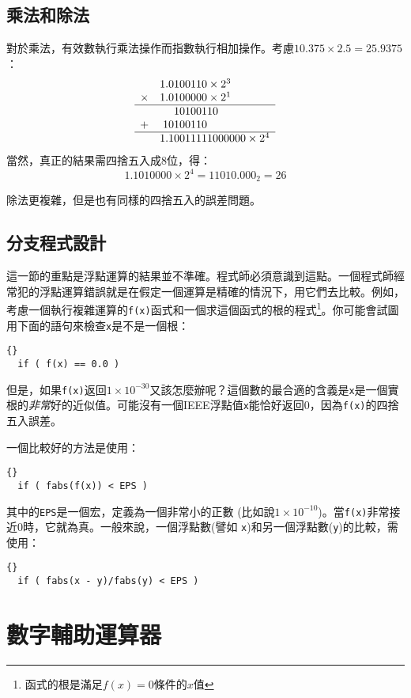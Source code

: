 {\subsection{乘法和除法}

對於乘法，有效數執行乘法操作而指數執行相加操作。考慮$10.375 \times 2.5 = 25.9375$：
\[
\begin{array}{rr@{}l}
 &  1.0&100110 \times 2^3 \\
\times &  1.0&100000 \times 2^1 \\ \hline
 &     &10100110 \\
+&   10&100110   \\ \hline
 &   1.1&0011111000000 \times 2^4
\end{array}
\]
當然，真正的結果需四捨五入成8位，得：
\[1.1010000 \times 2^4 = 11010.000_2 = 26 \]

除法更複雜，但是也有同樣的四捨五入的誤差問題。

\subsection{分支程式設計}

這一節的重點是浮點運算的結果並不準確。程式師必須意識到這點。一個程式師經常犯的浮點運算錯誤就是在假定一個運算是精確的情況下，用它們去比較。例如，考慮一個執行複雜運算的\lstinline|f(x)|函式和一個求這個函式的根的程式\footnote{函式的根是滿足$f(x) = 0$條件的$x$值}。你可能會試圖用下面的語句來檢查\lstinline|x|是不是一個根：
\begin{lstlisting}[stepnumber=0]{}
  if ( f(x) == 0.0 )
\end{lstlisting}
但是，如果\lstinline|f(x)|返回$1 \times 10^{-30}$又該怎麼辦呢？這個數的最合適的含義是\lstinline|x|是一個實根的\emph{非常}好的近似值。可能沒有一個IEEE浮點值\lstinline|x|能恰好返回0，因為\lstinline|f(x)|的四捨五入誤差。

一個比較好的方法是使用：
\begin{lstlisting}[stepnumber=0]{}
  if ( fabs(f(x)) < EPS )
\end{lstlisting}
其中的\lstinline|EPS|是一個宏，定義為一個非常小的正數
(比如說$1 \times 10^{-10}$)。當\lstinline|f(x)|非常接近0時，它就為真。一般來說，一個浮點數(譬如
\lstinline|x|)和另一個浮點數(\lstinline|y|)的比較，需使用：
\begin{lstlisting}[stepnumber=0]{}
  if ( fabs(x - y)/fabs(y) < EPS )
\end{lstlisting}

\section{數字輔助運算器}
}
